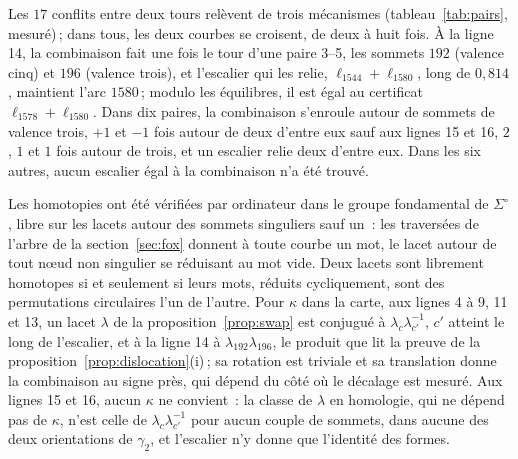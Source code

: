 \documentclass[11pt,a4paper]{article}
\begin{document}
Les $17$ conflits entre deux tours relèvent de trois mécanismes
(tableau~\ref{tab:pairs}, mesuré)\,; dans tous, les deux courbes se croisent,
de deux à huit fois. À la ligne 14, la combinaison fait une fois le tour d'une
paire 3--5, les sommets $192$ (valence cinq) et $196$ (valence trois), et
l'escalier qui les relie, $\ell_{1544} + \ell_{1580}$, long de $0,814$,
maintient l'arc $1580$\,; modulo les équilibres, il est égal au certificat
$\ell_{1578} + \ell_{1580}$. Dans dix paires, la combinaison s'enroule autour
de sommets de valence trois, $+1$ et $-1$ fois autour de deux d'entre eux sauf
aux lignes 15 et 16, $2$, $1$ et $1$ fois autour de trois, et un escalier
relie deux d'entre eux. Dans les six autres, aucun escalier égal à la
combinaison n'a été trouvé.

Les homotopies ont été vérifiées par ordinateur dans le groupe fondamental de
$\Sigma^\circ$, libre sur les lacets autour des sommets singuliers sauf un~:
les traversées de l'arbre de la section~\ref{sec:fox} donnent à toute courbe
un mot, le lacet autour de tout nœud non singulier se réduisant au mot vide. Deux
lacets sont librement homotopes si et seulement si leurs mots, réduits
cycliquement, sont des permutations circulaires l'un de l'autre. Pour
$\kappa$ dans la carte, aux lignes 4 à 9, 11 et 13, un lacet $\lambda$ de la
proposition~\ref{prop:swap} est conjugué à $\lambda_c \lambda_{c'}^{-1}$,
$c'$ atteint le long de l'escalier, et à la ligne 14 à $\lambda_{192}
\lambda_{196}$, le produit que lit la preuve de la
proposition~\ref{prop:dislocation}(i)\,; sa rotation est triviale et sa
translation donne la combinaison au signe près, qui dépend du côté où le
décalage est mesuré. Aux lignes 15 et 16, aucun $\kappa$ ne
convient~: la classe de $\lambda$ en homologie, qui ne dépend pas de
$\kappa$, n'est celle de $\lambda_c \lambda_{c'}^{-1}$ pour aucun couple de
sommets, dans aucune des deux orientations de $\gamma_2$, et l'escalier n'y donne que l'identité des formes.
\end{document}
